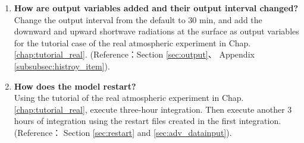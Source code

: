 \begin{enumerate}
\item {\bf How are output variables added and their output interval changed?}\\
Change the output interval from the default to 30 min, and add the downward and upward shortwave radiations at the surface as output variables for the tutorial case of the real atmospheric experiment in Chap. \ref{chap:tutorial_real}. (Reference：Section \ref{sec:output}、 Appendix \ref{subsubsec:histroy_item}).

\item {\bf How does the model restart?}\\
Using the tutorial of the real atmospheric experiment in Chap. \ref{chap:tutorial_real}, execute three-hour integration. Then execute another 3 hours of integration using the restart files created in the first integration.
(Reference： Section \ref{sec:restart} and \ref{sec:adv_datainput}).


\end{enumerate}


